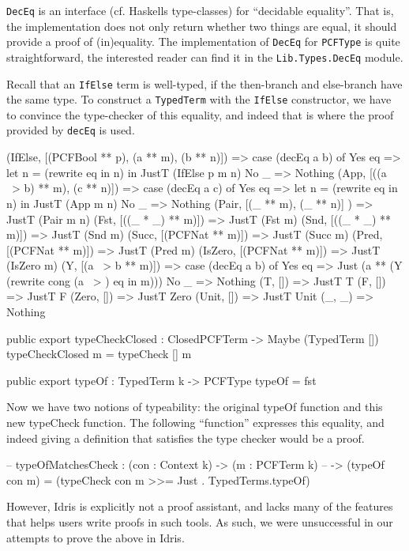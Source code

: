 \lstinline{DecEq} is an interface (cf. Haskells type-classes) for ``decidable equality''.
That is, the implementation does not only return whether two things are equal, it should provide a proof of (in)equality.
The implementation of \lstinline{DecEq} for \lstinline{PCFType} is quite straightforward, the interested reader can find it in the \lstinline{Lib.Types.DecEq} module.

Recall that an \lstinline{IfElse} term is well-typed, if the then-branch and else-branch have the same type. To construct a \lstinline{TypedTerm} with the \lstinline{IfElse} constructor, we have to convince the type-checker of this equality, and indeed that is where the proof provided by \lstinline{decEq} is used.

\begin{code}
  (IfElse,  [(PCFBool ** p), (a ** m), (b ** n)]) 
      => case (decEq a b) of
            Yes eq => let n = (rewrite eq in n) in JustT (IfElse p m n)
            No  _  => Nothing
  (App,     [((a ~> b) ** m), (c ** n)])
      => case (decEq a c) of
            Yes eq => let n = (rewrite eq in n) in JustT (App m n)
            No  _  => Nothing
  (Pair,    [(_ ** m), (_ ** n)] )  => JustT (Pair m n)
  (Fst,     [((_ * _) ** m)])       => JustT (Fst m)
  (Snd,     [((_ * _) ** m)])       => JustT (Snd m)
  (Succ,    [(PCFNat ** m)])        => JustT (Succ m)
  (Pred,    [(PCFNat ** m)])        => JustT (Pred m)
  (IsZero,  [(PCFNat ** m)])        => JustT (IsZero m)
  (Y,       [(a ~> b ** m)])        => case (decEq a b) of
                                          Yes eq => Just (a ** (Y (rewrite cong (a ~> ) eq in m)))
                                          No  _  => Nothing
  (T,       [])                     => JustT T
  (F,       [])                     => JustT F
  (Zero,    [])                     => JustT Zero
  (Unit,    [])                     => JustT Unit
  (_, _)                            => Nothing
\end{code}

\begin{code}
public export
typeCheckClosed : ClosedPCFTerm -> Maybe (TypedTerm [])
typeCheckClosed m = typeCheck [] m
\end{code}

\begin{code}
public export
typeOf : TypedTerm k -> PCFType
typeOf = fst
\end{code}


Now we have two notions of typeability: the original typeOf function and this new typeCheck function.
The following ``function'' expresses this equality, and indeed giving a definition that satisfies the type checker would be a proof.
\begin{code}
-- typeOfMatchesCheck : (con : Context k) -> (m : PCFTerm k) 
--                        -> (typeOf con m) = (typeCheck con m >>= Just . TypedTerms.typeOf)
\end{code}
However, Idris is explicitly not a proof assistant, and lacks many of the features that helps users write proofs in such tools.
As such, we were unsuccessful in our attempts to prove the above in Idris.

